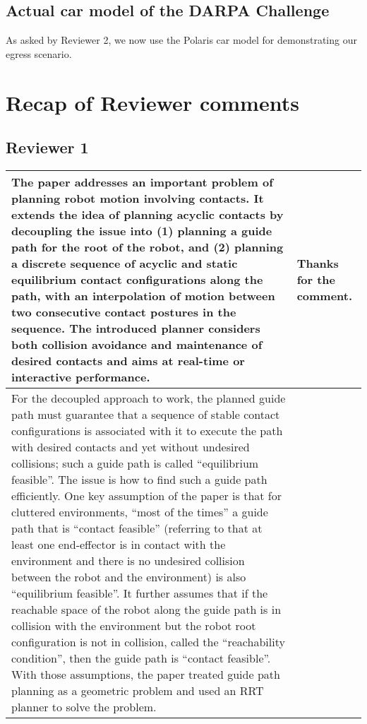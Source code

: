 \documentclass[a4paper]{article}
\begin{document}
\subsection{Actual car model of the DARPA Challenge}
As asked by Reviewer 2, we now use the Polaris car model for demonstrating our egress scenario.

\newpage
\section{Recap of Reviewer comments}

\subsection{Reviewer 1}
\noindent
\begin{longtable}{|p{21em}|p{21em}|}
\hline
The paper addresses an important problem of planning robot motion involving contacts. It extends the idea of planning acyclic contacts by decoupling the issue into (1) planning a guide path for the root of the robot, and (2) planning a discrete sequence of acyclic and static equilibrium contact configurations along the path, with an interpolation of motion between two consecutive contact postures in the sequence. The introduced planner considers both collision avoidance and maintenance of desired contacts and aims at real-time or interactive performance. 
&Thanks for the comment.
\\ \hline %
For the decoupled approach to work, the planned guide path must guarantee that a sequence of stable contact configurations is associated with it to execute the path with desired contacts and yet without undesired collisions; such a guide path is called “equilibrium feasible”. The issue is how to find such a guide path efficiently. One key assumption of the paper is that for cluttered environments, “most of the times” a guide path that is “contact feasible” (referring to that at least one end-effector is in contact with the environment and there is no undesired collision between the robot and the environment) is also “equilibrium feasible”. It further assumes that if the reachable space of the robot along the guide path is in collision with the environment but the robot root configuration is not in collision, called the “reachability condition”, then the guide path is “contact feasible”. With those assumptions, the paper treated guide path planning as a geometric problem and used an RRT planner to solve the problem. 

\end{longtable}
\end{document}
